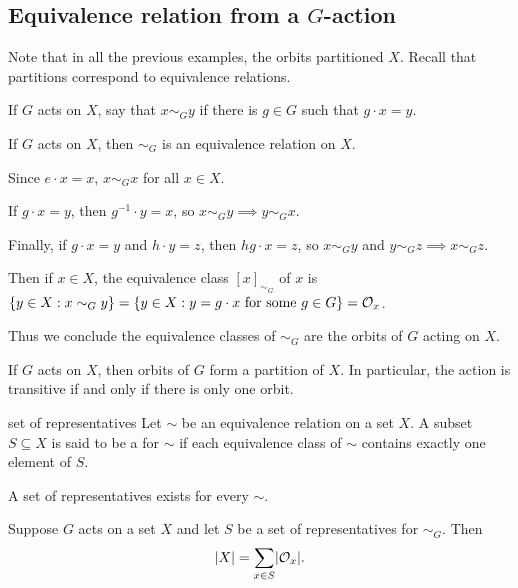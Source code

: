 \documentclass[12pt,letterpaper]{report}
\begin{document}
\pagebreak
\subsection[Equivalence relation from a G-action]{Equivalence relation from a $G$-action}

Note that in all the previous examples, the orbits partitioned $X$.
Recall that partitions correspond to equivalence relations.

\begin{defn}{}{}
  If $G$ acts on $X$, say that $x \sim_G y$ if there is $g \in G$ such that $g \cdot x = y$.
\end{defn}

\begin{lem}{}{}
  If $G$ acts on $X$, then $\sim_G$ is an equivalence relation on $X$.
\end{lem}

\begin{thmproof}
  Since $e \cdot x = x$, $x \sim_G x$ for all $x \in X$.

  If $g \cdot x = y$, then $g^{-1} \cdot y = x$, so $x \sim_G y \implies y \sim_G x$.

  Finally, if $g \cdot x = y$ and $h \cdot y = z$, then $hg \cdot x = z$, so $x \sim_G y$ and
  $y \sim_G z \implies x \sim_G z$.
\end{thmproof}

Then if $x \in X$, the equivalence class $[x]_{\sim_G}$ of $x$ is
$\{y \in X : x \sim_G y\} = \{y \in X : y = g \cdot x \text{ for some } g \in G\} = \mathcal{O}_x$.

Thus we conclude the equivalence classes of $\sim_G$ are the orbits of $G$ acting on $X$.

\begin{prop}{}{}
  If $G$ acts on $X$, then orbits of $G$ form a partition of $X$.
  In particular, the action is transitive if and only if there is only one orbit.
\end{prop}

\begin{defn}{set of representatives}{}
  Let $\sim$ be an equivalence relation on a set $X$.
  A subset $S \subseteq X$ is said to be a  for $\sim$ if each
  equivalence class of $\sim$ contains exactly one element of $S$.
\end{defn}

A set of representatives exists for every $\sim$.

\begin{cor}{}{}
  Suppose $G$ acts on a set $X$ and let $S$ be a set of representatives for $\sim_G$.
  Then
  \[ \lvert X\rvert = \sum_{x \in S} \lvert\mathcal{O}_x\rvert. \]
\end{cor}
\end{document}
